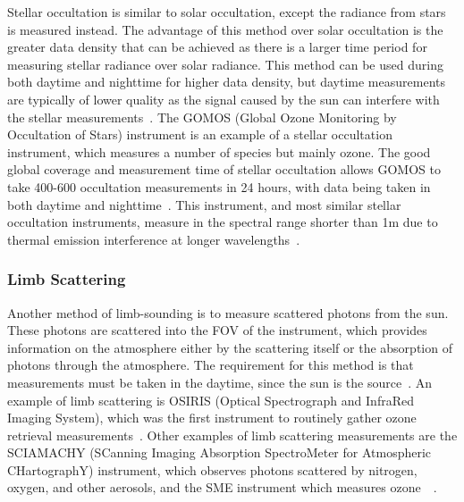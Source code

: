 Stellar occultation is similar to solar occultation, except the radiance from stars is measured instead. The advantage of this method over solar occultation is the greater data density that can be achieved as there is a larger time period for measuring stellar radiance over solar radiance. This method can be used during both daytime and nighttime for higher data density, but daytime measurements are typically of lower quality as the signal caused by the sun can interfere with the stellar measurements~\citep{SPARC}. The GOMOS (Global Ozone Monitoring by Occultation of Stars) instrument is an example of a stellar occultation instrument, which measures a number of species but mainly ozone. The good global coverage and measurement time of stellar occultation allows GOMOS to take 400-600 occultation measurements in 24 hours, with data being taken in both daytime and nighttime~\citep{GOMOS_stellar_occulation}. This instrument, and most similar stellar occultation instruments, measure in the spectral range shorter than 1\textmu m due to thermal emission interference at longer wavelengths~\citep{SPARC}.

\subsubsection{Limb Scattering}
Another method of limb-sounding is to measure scattered photons from the sun. These photons are scattered into the FOV of the instrument, which provides information on the atmosphere either by the scattering itself or the absorption of photons through the atmosphere. The requirement for this method is that measurements must be taken in the daytime, since the sun is the source~\citep{SPARC}. An example of limb scattering is OSIRIS (Optical Spectrograph and InfraRed Imaging System), which was the first instrument to routinely gather ozone retrieval measurements~\citep{OSIRIS}. Other examples of limb scattering measurements are the SCIAMACHY (SCanning Imaging Absorption SpectroMeter for Atmospheric CHartographY) instrument, which observes photons scattered by nitrogen, oxygen, and other aerosols, and the SME instrument which measures ozone~\citep{SCIAMACHY_limb_scattering}~\citep{SME}.


